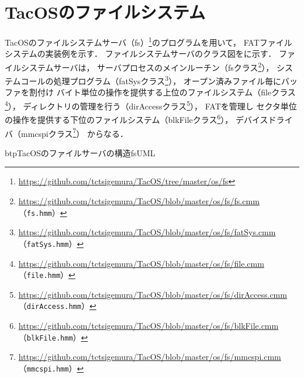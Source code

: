 \chapter{TacOSのファイルシステム}
\label{tacosFAT}

TacOSのファイルシステムサーバ（fs）\footnote{
  \url{https://github.com/tctsigemura/TacOS/tree/master/os/fs}
}のプログラムを用いて，
FATファイルシステムの実装例を示す．
ファイルシステムサーバのクラス図をに示す．
ファイルシステムサーバは，
サーバプロセスのメインルーチン（fsクラス\footnote{
  \url{https://github.com/tctsigemura/TacOS/blob/master/os/fs/fs.cmm}
  （\texttt{fs.hmm}）}），
システムコールの処理プログラム（fatSysクラス\footnote{
  \url{https://github.com/tctsigemura/TacOS/blob/master/os/fs/fatSys.cmm}
  （\texttt{fatSys.hmm}）}），
オープン済みファイル毎にバッファを割付け
バイト単位の操作を提供する上位のファイルシステム（fileクラス\footnote{
  \url{https://github.com/tctsigemura/TacOS/blob/master/os/fs/file.cmm}
  （\texttt{file.hmm}）}），
ディレクトリの管理を行う（dirAccessクラス\footnote{
  \url{https://github.com/tctsigemura/TacOS/blob/master/os/fs/dirAccess.cmm}
  （\texttt{dirAccess.hmm}）}），
FATを管理し
セクタ単位の操作を提供する下位のファイルシステム（blkFileクラス\footnote{
  \url{https://github.com/tctsigemura/TacOS/blob/master/os/fs/blkFile.cmm}
  （\texttt{blkFile.hmm}）}），
デバイスドライバ（mmcspiクラス\footnote{
  \url{https://github.com/tctsigemura/TacOS/blob/master/os/fs/mmcspi.cmm}
  （\texttt{mmcspi.hmm}）}）
からなる．

\begin{myfig}{btp}{TacOSのファイルサーバの構造}{fsUML}
\end{myfig}


